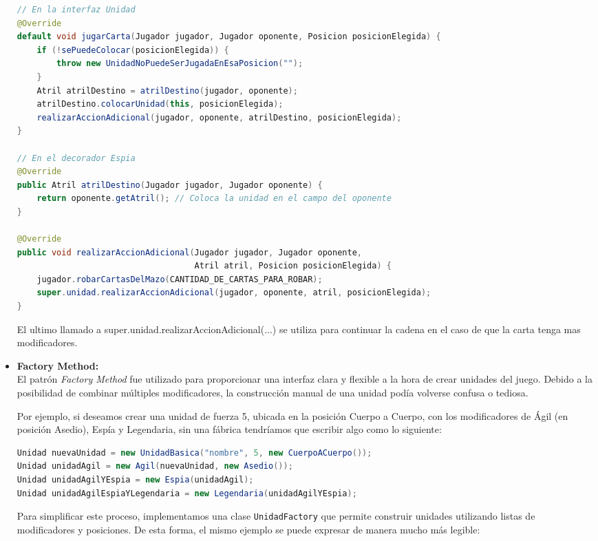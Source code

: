 \documentclass[titlepage,a4paper]{article}
\begin{document}
\begin{itemize}
		\begin{lstlisting}[language=Java, caption={Ejemplo de patrón Template + Decorator en una carta con modificador Espia}]
// En la interfaz Unidad
@Override
default void jugarCarta(Jugador jugador, Jugador oponente, Posicion posicionElegida) {
    if (!sePuedeColocar(posicionElegida)) {
        throw new UnidadNoPuedeSerJugadaEnEsaPosicion("");
    }
    Atril atrilDestino = atrilDestino(jugador, oponente);
    atrilDestino.colocarUnidad(this, posicionElegida);
    realizarAccionAdicional(jugador, oponente, atrilDestino, posicionElegida);
}

// En el decorador Espia
@Override
public Atril atrilDestino(Jugador jugador, Jugador oponente) {
    return oponente.getAtril(); // Coloca la unidad en el campo del oponente
}

@Override
public void realizarAccionAdicional(Jugador jugador, Jugador oponente,
                                    Atril atril, Posicion posicionElegida) {
    jugador.robarCartasDelMazo(CANTIDAD_DE_CARTAS_PARA_ROBAR);
    super.unidad.realizarAccionAdicional(jugador, oponente, atril, posicionElegida);
}
		\end{lstlisting}
El ultimo llamado a super.unidad.realizarAccionAdicional(...) se utiliza para continuar la cadena en el caso de que la carta tenga mas modificadores.

		\item \textbf{Factory Method:} \\
		El patrón \textit{Factory Method} fue utilizado para proporcionar una interfaz clara y flexible a la hora de crear unidades del juego. Debido a la posibilidad de combinar múltiples modificadores, la construcción manual de una unidad podía volverse confusa o tediosa.

		Por ejemplo, si deseamos crear una unidad de fuerza 5, ubicada en la posición Cuerpo a Cuerpo, con los modificadores de Ágil (en posición Asedio), Espía y Legendaria, sin una fábrica tendríamos que escribir algo como lo siguiente:

		\begin{lstlisting}[language=Java, caption={Ejemplo de creación de unidad sin usar UnidadFactory}]
Unidad nuevaUnidad = new UnidadBasica("nombre", 5, new CuerpoACuerpo());
Unidad unidadAgil = new Agil(nuevaUnidad, new Asedio());
Unidad unidadAgilYEspia = new Espia(unidadAgil);
Unidad unidadAgilEspiaYLegendaria = new Legendaria(unidadAgilYEspia);
		\end{lstlisting}

		Para simplificar este proceso, implementamos una clase \texttt{UnidadFactory} que permite construir unidades utilizando listas de modificadores y posiciones. De esta forma, el mismo ejemplo se puede expresar de manera mucho más legible:


\end{itemize}
\end{document}
